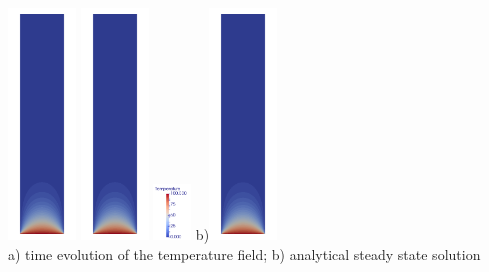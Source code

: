 \begin{center}
\includegraphics[width=1.8cm]{images/benchmark_lapplate/temper0040.png}
\includegraphics[width=1.8cm]{images/benchmark_lapplate/temper0050.png}
\includegraphics[width=1cm]{images/benchmark_lapplate/colourscale.png}
\hspace{.2cm}
b)\includegraphics[width=1.8cm]{images/benchmark_lapplate/temper_analytical.png}\\
{\small a) time evolution of the temperature field; b) analytical steady state solution}
\end{center}




